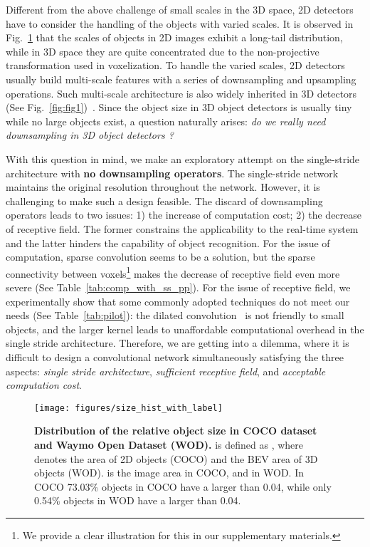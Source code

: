 \par
Different from the above challenge of small scales in the 3D space, 2D detectors have to consider the handling of the objects with varied scales.
It is observed in Fig.~\ref{fig:hist} that the scales of objects in 2D images exhibit a long-tail distribution, while in 3D space they are quite concentrated due to the non-projective transformation used in voxelization.
To handle the varied scales, 2D detectors~\cite{fpn, snip, sniper, tridentnet} usually build multi-scale features with a series of downsampling and upsampling operations.
Such multi-scale architecture is also widely inherited in 3D detectors (See Fig.~\ref{fig:fig1})~\cite{pointpillar, second, voxelnet, centerpoint, rangedet}.
Since the object size in 3D object detectors is usually tiny while no large objects exist, a question naturally arises: \textit{do we really need downsampling in 3D object detectors ?}
\par
With this question in mind, we make an exploratory attempt on the single-stride architecture with \textbf{no downsampling operators}. The single-stride network maintains the original resolution throughout the network. However, it is challenging to make such a design feasible.
The discard of downsampling operators leads to two issues: 1) the increase of computation cost; 2) the decrease of receptive field. 
The former constrains the applicability to the real-time system and the latter hinders the capability of object recognition.
For the issue of computation, sparse convolution seems to be a solution, but the sparse connectivity between voxels\footnote{We provide a clear illustration for this in our supplementary materials.} makes the decrease of receptive field even more severe (See Table~\ref{tab:comp_with_ss_pp}).
For the issue of receptive field, we experimentally show that some commonly adopted techniques do not meet our needs (See Table~\ref{tab:pilot}):
the dilated convolution~\cite{deeplab,dilation} is not friendly to small objects, and the larger kernel leads to unaffordable computational overhead in the single stride architecture.
Therefore, we are getting into a dilemma, where it is difficult to design a convolutional network simultaneously satisfying the three aspects: \textit{single stride architecture}, \textit{sufficient receptive field}, and \textit{acceptable computation cost}.

\begin{figure}[t]
    \centering
    \texttt{[image: figures/size\_hist\_with\_label]}
    \caption{\textbf{Distribution of the relative object size  in COCO dataset~\cite{coco} and Waymo Open Dataset (WOD).}  is defined as , where  denotes the area of 2D objects (COCO) and the BEV area of 3D objects (WOD).  is the image area in COCO, and  in WOD. In COCO 73.03\% objects in COCO have a  larger than 0.04, while only 0.54\% objects in WOD have a  larger than 0.04.}
    \label{fig:hist}
\vspace{-5mm}
\end{figure}

